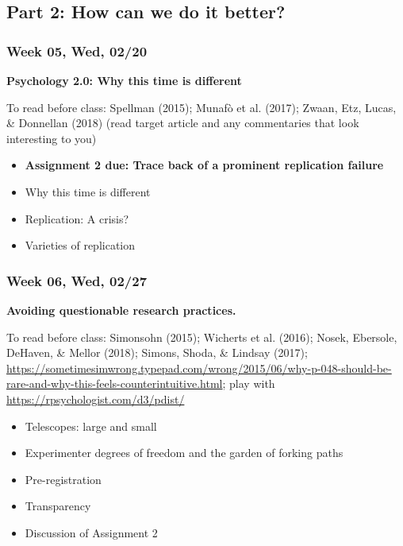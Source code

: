 \documentclass[11pt,man]{article}
\providecommand{\tightlist}{%
  \setlength{\itemsep}{0pt}\setlength{\parskip}{0pt}}
\begin{document}
\subsection{Part 2: How can we do it
better?}\label{part-2-how-can-we-do-it-better}

\subsubsection{Week 05, Wed, 02/20}\label{week-05-wed-0220}

\textbf{Psychology 2.0: Why this time is different}

To read before class: Spellman (2015); Munafò et al. (2017); Zwaan, Etz,
Lucas, \& Donnellan (2018) (read target article and any commentaries
that look interesting to you)

\begin{itemize}
\item
  \textbf{Assignment 2 due: Trace back of a prominent replication
  failure}
\item
  Why this time is different
\item
  Replication: A crisis?
\item
  Varieties of replication
\end{itemize}

\newpage

\subsubsection{Week 06, Wed, 02/27}\label{week-06-wed-0227}

\textbf{Avoiding questionable research practices.}

To read before class: Simonsohn (2015); Wicherts et al. (2016); Nosek,
Ebersole, DeHaven, \& Mellor (2018); Simons, Shoda, \& Lindsay (2017);
\url{https://sometimesimwrong.typepad.com/wrong/2015/06/why-p-048-should-be-rare-and-why-this-feels-counterintuitive.html};
play with \url{https://rpsychologist.com/d3/pdist/}

\begin{itemize}
\tightlist
\item
  Telescopes: large and small
\item
  Experimenter degrees of freedom and the garden of forking paths
\item
  Pre-registration
\item
  Transparency
\item
  Discussion of Assignment 2
\end{itemize}
\end{document}
